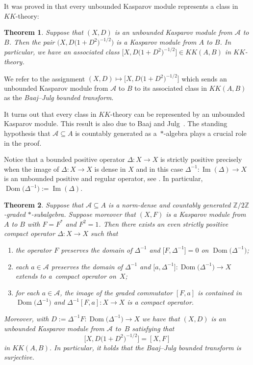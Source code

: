 \documentclass[pdftex]{sigma}
\numberwithin{equation}{section}
\newtheorem{Theorem}{Theorem}[section]
\newcommand{\zz}{\mathbb{Z}}
\newcommand{\De}{\Delta}
\newcommand{\s}[1]{\mathscr{#1}}
\newcommand{\su}{\subseteq}
\begin{document}
It was proved in \cite{BaJu:TBK} that every unbounded Kasparov module represents a class in $KK$-theory:

\begin{Theorem}
Suppose that $(X,D)$ is an unbounded Kasparov module from $\s A$ to $B$. Then the pair $\big(X, D\big(1 + D^2\big)^{-1/2}\big)$ is a Kasparov module from $A$ to $B$. In particular, we have an associated class $\big[X, D\big(1 + D^2\big)^{-1/2}\big] \in KK(A,B)$ in $KK$-theory.
\end{Theorem}

We refer to the assignment $(X,D) \mapsto \big[ X, D\big(1 + D^2\big)^{-1/2}\big]$ which sends an unbounded Kasparov module from $\s A$ to $B$ to its associated class in $KK(A,B)$ as the \emph{Baaj--Julg bounded transform}.

It turns out that every class in $KK$-theory can be represented by an unbounded Kasparov module. This result is also due to Baaj and Julg~\cite{BaJu:TBK}. The standing hypothesis that $\s A \su A$ is countably generated as a~$*$-algebra plays a crucial role in the proof.

Notice that a bounded positive operator $\De\colon X \to X$ is strictly positive precisely when the image of $\De\colon X \to X$ is dense in $X$ and in this case $\De^{-1}\colon \operatorname{Im}(\De) \to X$ is an unbounded positive and regular operator, see \cite[Lemma~10.1]{Lan:HCM}. In particular, $\operatorname{Dom}\big(\De^{-1}\big) := \operatorname{Im}(\De)$.

\begin{Theorem}\label{t:bousur}
Suppose that $\s A \su A$ is a norm-dense and countably generated $\zz/2\zz$-graded $*$-subalgebra. Suppose moreover that $(X,F)$ is a Kasparov module from $A$ to $B$ with $F = F^*$ and $F^2 = 1$. Then there exists an even strictly positive compact operator $\De\colon X \to X$ such that
\begin{enumerate}\itemsep=0pt
\item[$1)$] the operator $F$ preserves the domain of $\De^{-1}$ and $\big[ F, \De^{-1} \big] = 0$ on $\operatorname{Dom}\big(\De^{-1}\big)$;
\item[$2)$] each $a \in \s A$ preserves the domain of $\De^{-1}$ and $\big[a,\De^{-1}\big] \colon \operatorname{Dom}\big(\De^{-1}\big) \to X$ extends to a~compact operator on~$X$;
\item[$3)$] for each $a \in \s A$, the image of the graded commutator $[F,a]$ is contained in $\operatorname{Dom}\big(\De^{-1}\big)$ and $\De^{-1}[F,a]\colon X \to X$ is a compact operator.
\end{enumerate}
Moreover, with $D := \De^{-1} F\colon \operatorname{Dom}\big(\De^{-1}\big) \to X$ we have that $(X, D)$ is an unbounded Kasparov module from $\s A$ to~$B$ satisfying that
\[
\big[ X, D\big(1 + D^2\big)^{-1/2}\big] = [X,F]
\]
in $KK(A,B)$. In particular, it holds that the Baaj--Julg bounded transform is surjective.
\end{Theorem}
\end{document}
